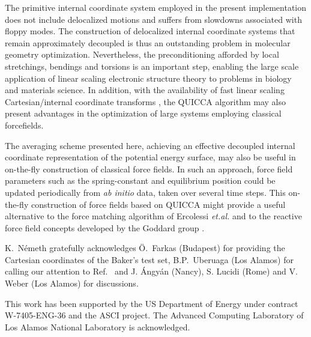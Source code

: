 \documentclass[prl,twocolumn,showpacs,twocolumngrid,superbib]{revtex4}
\begin{document}
The primitive internal coordinate system employed in the present implementation does not include
delocalized motions and suffers from slowdowns associated with floppy modes.  The construction of 
delocalized internal coordinate systems that remain approximately
decoupled is thus an outstanding problem in molecular geometry optimization.   Nevertheless, the
preconditioning afforded by local stretchings, bendings and torsions is an important step, enabling 
the large scale application of  linear scaling electronic structure theory to problems in biology and 
materials science.   In addition, with the availability of fast linear scaling Cartesian/internal coordinate 
transforms \cite{nemeth_coordtrf1}, the QUICCA algorithm may also present advantages in the optimization of 
large systems employing classical forcefields.  

The averaging scheme presented here, achieving an effective decoupled internal coordinate representation
of the potential energy surface, may also be useful in on-the-fly construction of classical force fields.
In such an approach, force field parameters such as the spring-constant and equilibrium position 
could be updated periodically from {\em ab initio} data, taken over several time steps. 
This on-the-fly construction of force fields based on QUICCA might provide a useful  alternative to 
the force matching algorithm of Ercolessi {\it et.al.} \cite{force-matching} and to the reactive 
force field concepts developed by the Goddard group \cite{reaxff1,reaxff2}.

\begin{acknowledgments}
K.~N{\'e}meth gratefully acknowledges {\"{O}}.~Farkas (Budapest) for providing the 
Cartesian coordinates of the Baker's test set,  B.P.~Uberuaga (Los Alamos) for 
calling our attention to Ref.~\cite{force-matching} and  J. {\'A}ngy{\'a}n
(Nancy), S. Lucidi (Rome) and V. Weber (Los Alamos) for discussions.

This work has been supported by the US Department of Energy 
under contract W-7405-ENG-36 and the ASCI project.  
The Advanced Computing Laboratory of Los 
Alamos National Laboratory is acknowledged.
\end{acknowledgments}


\end{document}
